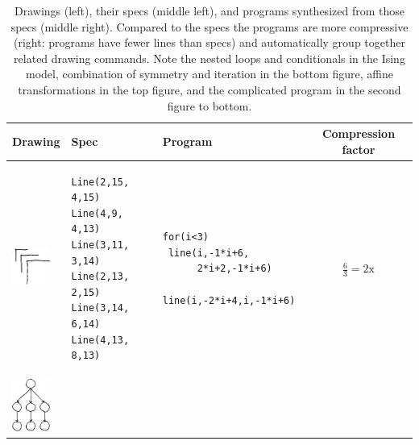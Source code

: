 \documentclass{article}
\theoremstyle{definition}
\begin{document}
\newcommand{\exampleProgramSize}{4cm}
\newcommand{\exampleTraceSize}{3.5cm}
\newcommand{\exampleDrawingSize}{1.25cm}
\lstset{basicstyle = \scriptsize\ttfamily}

\begin{table}[t]
  \caption{Drawings (left), their specs (middle left), and programs synthesized from those specs (middle right). Compared to the specs the programs are more compressive (right: programs have fewer lines than specs) and automatically group together related drawing commands. Note the nested loops  and conditionals in the Ising model, combination of symmetry and iteration in the bottom figure,  affine transformations in the top figure, and the complicated program in the second figure to bottom.}\label{exampleSynthesisResults}
\centering  \begin{tabular}{m{1.5cm}llc}
    \toprule
    \textbf{Drawing}&\textbf{Spec}&\textbf{Program}&%
      \textbf{Compression factor}%
      \\
    \midrule
    \includegraphics[width = \exampleDrawingSize]{figures/expert-29-trim.png}&
\begin{minipage}{\exampleTraceSize}\begin{lstlisting}
Line(2,15, 4,15)
Line(4,9, 4,13)
Line(3,11, 3,14)
Line(2,13, 2,15)
Line(3,14, 6,14)
Line(4,13, 8,13)
\end{lstlisting}
\end{minipage}&     \begin{minipage}{\exampleProgramSize} \begin{lstlisting}
for(i<3)
 line(i,-1*i+6,
      2*i+2,-1*i+6)
 line(i,-2*i+4,i,-1*i+6)
       \end{lstlisting}
     \end{minipage}&$\frac{6}{3} = 2\text{x}$\\\midrule
     \includegraphics[width = \exampleDrawingSize]{figures/expert-52-trim.png}&

\end{tabular}
\end{table}
\end{document}
